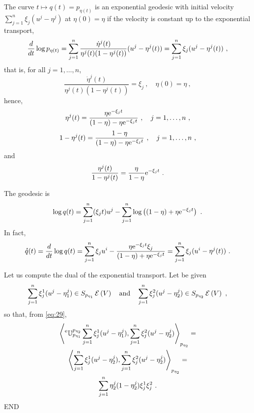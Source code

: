 \documentclass[12pt,a4paper]{amsart}
\begin{document}
The curve $t \mapsto q(t) = p_{\eta(t)}$ is an exponential geodesic with initial velocity $\sum_{j=1}^n \xi_j (u^j - \eta^j)$ at $\eta(0) = \eta$ if the velocity is constant up to the exponential transport,
\begin{equation}
  \label{eq:15}
  \derivby t \log p_{\eta(t)} =  \sum_{j=1}^n \frac{\dot \eta^j(t)}{\eta^j(t)(1 - \eta^j(t))} (u^j - \eta^j(t)) = \sum_{j=1}^n \xi_j (u^j - \eta^j(t)) \ ,  
\end{equation}
that is, for all $j = 1,\dots,n$,
\begin{equation}
  \label{eq:16}
  \frac {\dot \eta^j(t)} {\eta^j(t)(1-\eta^j(t))} = \xi_j \ , \quad  \eta(0) = \eta \ ,
\end{equation}
hence,
\begin{equation}
  \label{eq:33}
\eta^j(t) = \frac{\eta\euler^{-\xi_jt}} {(1-\eta) - \eta\euler^{-\xi_jt}} \ , \quad j=1,\dots, n \ ,  
\end{equation}
\begin{equation}
  \label{eq:34}
  1 - \eta^j(t) = \frac{1 - \eta} {(1-\eta) - \eta\euler^{-\xi_jt}} \ , \quad j=1,\dots, n \ ,  
\end{equation}
and
\begin{equation}
  \label{eq:35}
  \frac{\eta^j(t)}{1-\eta^j(t)} = \frac{\eta}{1-\eta}\euler^{-\xi_j t} \ .
\end{equation}

The geodesic is
\begin{equation}
  \label{eq:36}
  \log q(t) = \sum_{j=1}^n (\xi_j t) u^j - \sum_{j=1}^n \logof{(1-\eta)+\eta \euler^{-\xi_j t}} \ .
\end{equation}
In fact,
\begin{equation}
  \label{eq:37}
  \velocity q(t) = \derivby t \log q(t) = \sum_{j=1}^n \xi_j u^i - \frac{\eta \euler^{-\xi_j t} \xi_j}{(1-\eta)+\eta \euler^{-\xi_j t}} = \sum_{j=1}^n \xi_j (u^i - \eta^j(t)) \ .
\end{equation}

Let us compute the dual of the exponential transport. Let be given
\begin{equation}
  \label{eq:38}
  \sum_{j=1}^n \xi_j^1(u^j - \eta^j_1) \in \expfibreat {p_{\eta_1}} V \quad \text{and} \quad \sum_{j=1}^n \xi_j^2(u^j - \eta^j_2) \in \expfibreat {p_{\eta_2}} V \ ,
\end{equation}
so that, from \cref{eq:29},
\begin{multline}
  \label{eq:39}
  \scalarat {p_{\eta_2}} {\etransport {p_{\eta_1}} {p_{\eta_2}}  \sum_{j=1}^n \xi_j^1(u^j - \eta^j_1)} {\sum_{j=1}^n \xi_j^2(u^j - \eta^j_2)} = \\
   \scalarat {p_{\eta_2}} {\sum_{j=1}^n \xi_j^1(u^j - \eta^j_2)} {\sum_{j=1}^n \xi_j^2(u^j - \eta^j_2)} = \\
   \sum_{j=1}^n \eta^j_2(1-\eta^j_2) \xi_j^1 \xi_j^2 \ . 
 \end{multline}
END


% 


\end{document}

